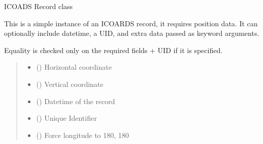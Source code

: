 \documentclass[letterpaper,10pt,english]{sphinxmanual}
\begin{document}
\begin{fulllineitems}
\label{\detokenize{users_guide:GeoSpatialTools.quadtree.Record}}
\pysigstartsignatures
\pysiglinewithargsret
{}
{\sphinxparamcomma {}\sphinxparamcomma {}\sphinxparamcomma {}\sphinxparamcomma {}\sphinxparamcomma {}}
{}
\pysigstopsignatures
\sphinxAtStartPar
ICOADS Record class

\sphinxAtStartPar
This is a simple instance of an ICOARDS record, it requires position data.
It can optionally include datetime, a UID, and extra data passed as
keyword arguments.

\sphinxAtStartPar
Equality is checked only on the required fields + UID if it is specified.
\begin{quote}\begin{description}
\begin{itemize}
\item {} 
\sphinxAtStartPar
{} () \textendash{} Horizontal coordinate

\item {} 
\sphinxAtStartPar
{} () \textendash{} Vertical coordinate

\item {} 
\sphinxAtStartPar
{} (\sphinxstyleliteralemphasis{\sphinxupquote{ | }}) \textendash{} Datetime of the record

\item {} 
\sphinxAtStartPar
{} (\sphinxstyleliteralemphasis{\sphinxupquote{ | }}) \textendash{} Unique Identifier

\item {} 
\sphinxAtStartPar
{} () \textendash{} Force longitude to \sphinxhyphen{}180, 180


\end{itemize}
\end{description}
\end{quote}
\end{fulllineitems}
\end{document}
